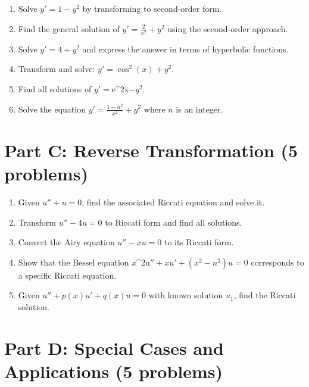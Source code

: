 \documentclass[12pt]{article}
\begin{document}
\begin{enumerate}[resume]
    \item Solve $y' = 1 - y^{2}$ by transforming to second-order form.

    \item Find the general solution of $y' = \frac{2}{x^{2}} + y^{2}$ using the second-order approach.

    \item Solve $y' = 4 + y^{2}$ and express the answer in terms of hyperbolic functions.

    \item Transform and solve: $y' = \cos^{2}(x) + y^{2}$.

    \item Find all solutions of $y' = $e^{2x}$ - y^{2}$.

    \item Solve the equation $y' = \frac{1 - n^{2}}{x^{2}} + y^{2}$ where $n$ is an integer.
\end{enumerate}

\section*{Part C: Reverse Transformation (5 problems)}

\begin{enumerate}[resume]
    \item Given $u'' + u = 0$, find the associated Riccati equation and solve it.

    \item Transform $u'' - 4u = 0$ to Riccati form and find all solutions.

    \item Convert the Airy equation $u'' - xu = 0$ to its Riccati form.

    \item Show that the Bessel equation $x$^{2u}$'' + xu' + (x^{2} - n^{2})u = 0$ corresponds to a specific Riccati equation.

    \item Given $u'' + p(x)u' + q(x)u = 0$ with known solution $u_{1}$, find the Riccati solution.
\end{enumerate}

\section*{Part D: Special Cases and Applications (5 problems)}
\end{document}
